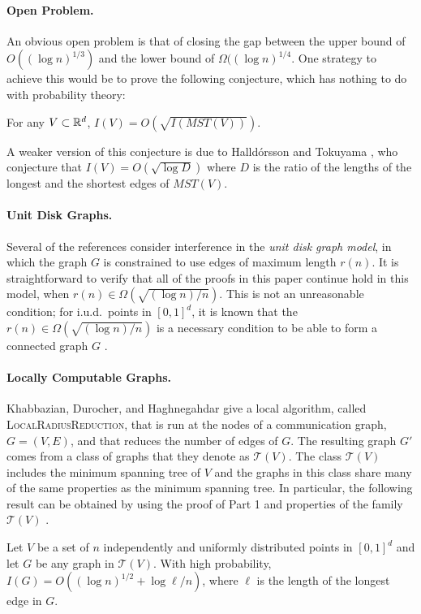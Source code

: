 \documentclass{patmorin}
\newcommand{\mst}{\mathit{MST}}
\begin{document}
\paragraph{Open Problem.}
An obvious open problem is that of closing the gap between the upper bound
of $O((\log n)^{1/3})$ and the lower bound of $\Omega((\log n)^{1/4}$.
One strategy to achieve this would be to prove the following conjecture,
which has nothing to do with probability theory:
\begin{conj}
  For any $V\subset\mathbb{R}^d$, $I(V) = O(\sqrt{I(\mst(V))})$.
\end{conj}
A weaker version of this conjecture is due to Halld\'orsson and Tokuyama
\cite{ht08}, who conjecture that $I(V)=O(\sqrt{\log D})$ where $D$ is the
ratio of the lengths of the longest and the shortest edges of $\mst(V)$.

\paragraph{Unit Disk Graphs.}
Several of the references consider interference in the \emph{unit
disk graph model}, in which the graph $G$ is constrained to use
edges of maximum length $r(n)$.  It is straightforward to verify
that all of the proofs in this paper continue hold in this model,
when $r(n)\in\Omega(\sqrt{(\log n)/n})$.  This is not an unreasonable
condition; for i.u.d.\ points in $[0,1]^d$, it is known that the
$r(n)\in\Omega(\sqrt{(\log n)/n})$ is a necessary condition to be able to
form a connected graph $G$ \cite{p97}.

\paragraph{Locally Computable Graphs.}
Khabbazian, Durocher, and Haghnegahdar \cite{kdh11} give a local
algorithm, called \textsc{LocalRadiusReduction}, that is run at the nodes
of a communication graph, $G=(V,E)$, and that reduces the number of edges
of $G$.  The resulting graph $G'$ comes from a class of graphs that
they denote as $\mathcal{T}(V)$.  The class $\mathcal{T}(V)$ includes
the minimum spanning tree of $V$ and the graphs in this class share
many of the same properties as the minimum spanning tree.  In particular,
the following result can be obtained by using the proof of  Part 1 and properties of the family $\mathcal{T}(V)$ \cite[Theorem~3]{kdh11}.

\setcounter{thm}{2}
\begin{thm}
  Let $V$ be a set of $n$ independently and uniformly distributed points
  in $[0,1]^d$ and let $G$ be any graph in $\mathcal{T}(V)$.  With high
  probability, $I(G)=O((\log n)^{1/2}+\log \ell/n)$, where $\ell$ is
  the length of the longest edge in $G$.
\end{thm}
\end{document}
